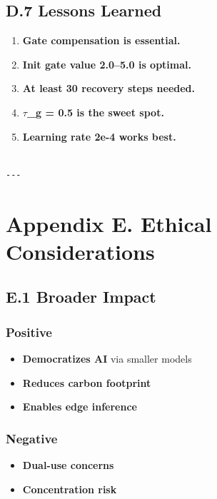 \subsection{D.7 Lessons Learned}

\begin{enumerate}
\item \textbf{Gate compensation is essential.}
\item \textbf{Init gate value 2.0--5.0 is optimal.}
\item \textbf{At least 30 recovery steps needed.}
\item \textbf{$\tau$\_g = 0.5 is the sweet spot.}
\item \textbf{Learning rate 2e-4 works best.}
\end{enumerate}
\begin{lstlisting}

---
\end{lstlisting}


\section{Appendix E. Ethical Considerations}

\subsection{E.1 Broader Impact}

\subsubsection{Positive}
\begin{itemize}
\item \textbf{Democratizes AI} via smaller models
\item \textbf{Reduces carbon footprint}
\item \textbf{Enables edge inference}

\end{itemize}
\subsubsection{Negative}
\begin{itemize}
\item \textbf{Dual-use concerns}
\item \textbf{Concentration risk}

\end{itemize}
